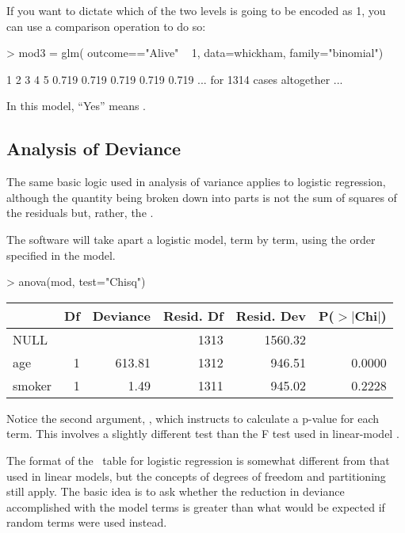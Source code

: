 If you want to dictate which of the two levels is going to be encoded
as 1, you can use a comparison operation to do so:
\begin{Schunk}
\begin{Sinput}
> mod3 = glm( outcome=="Alive" ~ 1, data=whickham, 
    family="binomial")
\end{Sinput}
\end{Schunk}

\begin{Schunk}
\begin{Soutput}
    1     2     3     4     5 
0.719 0.719 0.719 0.719 0.719 
... for 1314 cases altogether ...
\end{Soutput}
\end{Schunk}

In this model, ``Yes'' means .

\subsection{Analysis of Deviance}

The same basic logic used in analysis of variance applies to logistic
regression, although the quantity being broken down into parts is not
the sum of squares of the residuals but, rather, the .

The  software will take apart a logistic model, term by
term, using the order specified in the model.
\begin{Schunk}
\begin{Sinput}
> anova(mod, test="Chisq")
\end{Sinput}
\end{Schunk}

\begin{tabular}{lrrrrr}
  \hline
 & Df & Deviance & Resid. Df & Resid. Dev & P($>$$|$Chi$|$) \\ 
  \hline
NULL &  &  & 1313 & 1560.32 &  \\ 
  age & 1 & 613.81 & 1312 & 946.51 & 0.0000 \\ 
  smoker & 1 & 1.49 & 1311 & 945.02 & 0.2228 \\ 
   \hline
\end{tabular}

\noindent Notice the second argument, , which instructs
 to calculate a p-value for each term.  This involves a
slightly different test than the F test used in linear-model \ANOVA.

The format of the \ANOVA\ table for logistic regression is somewhat
different from that used in linear models, but the concepts of degrees
of freedom and partitioning still apply.  The basic idea is to ask
whether the reduction in deviance accomplished with the model terms is
greater than what would be expected if random terms were used instead.
